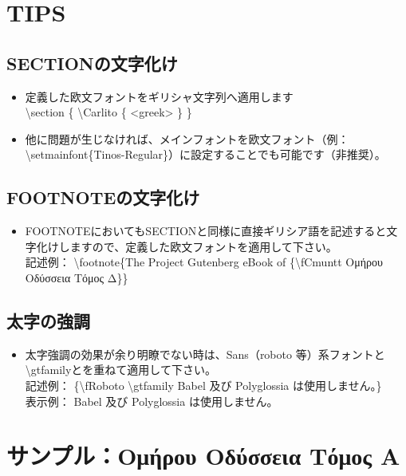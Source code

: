 \documentclass[a4paper,10pt]{ltjsarticle}
\def\colH#1{\color[HTML]{#1}}
\def\bs{\textbackslash }
\begin{document}
\section{TIPS} \vspace{-2mm}
\subsection{SECTIONの文字化け} \vspace{-1mm}  
\begin{itemize}
  \item 定義した欧文フォントをギリシャ文字列へ適用します\\
  \bs section \{ {\colH{800000} \bs Carlito \{ <greek> \}} \}
  \item 他に問題が生じなければ、メインフォントを欧文フォント（例：\bs setmainfont\{Tinos-Regular\}）に設定することでも可能です（非推奨）。\vspace{-1mm}
\end{itemize}
\subsection{FOOTNOTEの文字化け} \vspace{-1mm}  
\begin{itemize}
  \item FOOTNOTEにおいてもSECTIONと同様に直接ギリシア語を記述すると文字化けしますので、定義した欧文フォントを適用して下さい。\\
記述例： \bs footnote\{The Project Gutenberg eBook of {\colH{800000}\{\bs fCmuntt} \fCmuntt Ομήρου Οδύσσεια Τόμος Δ{\colH{800000}\}}\}
\end{itemize}

\subsection{太字の強調}  
\begin{itemize}
  \item 太字強調の効果が余り明瞭でない時は、Sans（roboto 等）系フォントと \bs gtfamilyとを重ねて適用して下さい。\\
記述例： \{{\colH{800000}\bs fRoboto \bs gtfamily} Babel 及び Polyglossia は使用しません。\}\\
表示例： {\fRoboto \gtfamily Babel 及び Polyglossia は使用しません。}
\end{itemize}

\section{サンプル：{\fCmuntt Ομήρου Οδύσσεια Τόμος Α}}  
\end{document}

